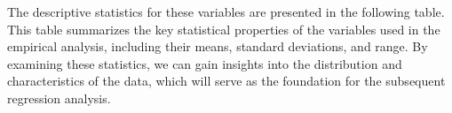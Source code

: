 \documentclass[preprint,12pt,authoryear]{elsarticle}
\begin{document}
The descriptive statistics for these variables are presented in the following table. This table summarizes the key statistical properties of the variables used in the empirical analysis, including their means, standard deviations, and range. By examining these statistics, we can gain insights into the distribution and characteristics of the data, which will serve as the foundation for the subsequent regression analysis.

\begin{table}[h]
  \centering
  \caption{Descriptive Statistics}
  \label{tab:descriptive_stats_transposed}
\end{table}
\end{document}
